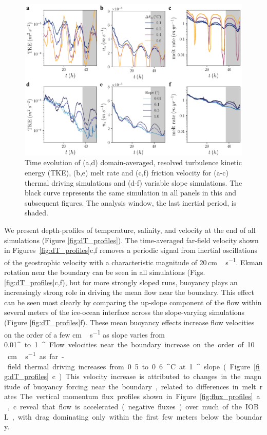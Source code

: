 \documentclass[tc, manuscript]{copernicus}
\begin{document}
\begin{figure}[t]
\includegraphics[width=12cm]{fig1_rev1.pdf}
\caption{Time evolution of (a,d) domain-averaged, resolved turbulence kinetic energy (TKE), (b,e) melt rate and (c,f) friction velocity for (a-c) thermal driving simulations and (d-f) variable slope simulations. The black curve represents the same simulation in all panels in this and subsequent figures. The analysis window, the last inertial period, is shaded.}
\label{fig:timeseries}
\end{figure}

We present depth-profiles of temperature, salinity, and velocity at the end of all simulations (Figure \ref{fig:dT_profiles}). The time-averaged far-field velocity shown in Figures~\ref{fig:dT_profiles}c,f removes a periodic signal from inertial oscillations of the geostrophic velocity with a characteristic magnitude of 20\,\unit{cm\,s^{-1}}. Ekman rotation near the boundary can be seen in all simulations (Figs. \ref{fig:dT_profiles}c,f), but for more strongly sloped runs, buoyancy plays an increasingly strong role in driving the mean flow near the boundary. This effect can be seen most clearly by comparing the up-slope component of the flow within several meters of the ice-ocean interface across the slope-varying simulations (Figure \ref{fig:dT_profiles}f). These mean buoyancy effects increase flow velocities on the order of a few \unit{cm\,s^{-1}} as slope varies from 0.01\unit{^{\circ}} to 1\unit{^{\circ}}. Flow velocities near the boundary increase on the order of 10\,\unit{cm\,s^{-1}} as far-field thermal driving increases from 0.5 to 0.6\unit{^{\circ}C} at 1\unit{^{\circ}} slope (Figure \ref{fig:dT_profiles}c). This velocity increase is attributed to changes in the magnitude of buoyancy forcing near the boundary, related to differences in melt rates. The vertical momentum flux profiles shown in Figure~\ref{fig:flux_profiles}a,c reveal that flow is accelerated (negative fluxes) over much of the IOBL, with drag dominating only within the first few meters below the boundary.
 
\end{document}
